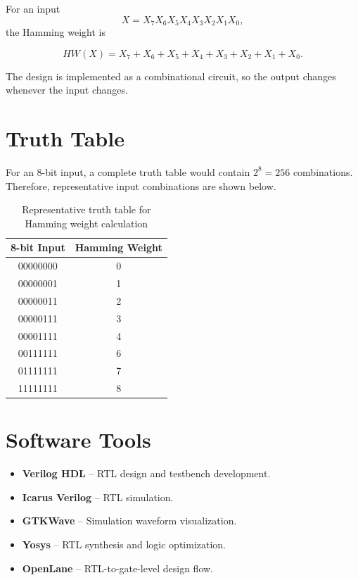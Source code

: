 \documentclass[12pt,a4paper]{report}
\begin{document}
For an input
\[
X = X_7X_6X_5X_4X_3X_2X_1X_0,
\]
the Hamming weight is

\[
HW(X) = X_7 + X_6 + X_5 + X_4 + X_3 + X_2 + X_1 + X_0.
\]

The design is implemented as a combinational circuit, so the output changes whenever the input changes.

\section{Truth Table}

For an 8-bit input, a complete truth table would contain $2^8=256$ combinations. Therefore, representative input combinations are shown below.

\begin{table}[H]
    \centering
    \begin{tabular}{|c|c|}
        \hline
        \textbf{8-bit Input} & \textbf{Hamming Weight} \\
        \hline
        00000000 & 0 \\
        \hline
        00000001 & 1 \\
        \hline
        00000011 & 2 \\
        \hline
        00000111 & 3 \\
        \hline
        00001111 & 4 \\
        \hline
        00111111 & 6 \\
        \hline
        01111111 & 7 \\
        \hline
        11111111 & 8 \\
        \hline
    \end{tabular}
    \caption{Representative truth table for Hamming weight calculation}
    \label{tab:hamming_weight}
\end{table}

\section{Software Tools}

\begin{itemize}
    \item \textbf{Verilog HDL} -- RTL design and testbench development.
    \item \textbf{Icarus Verilog} -- RTL simulation.
    \item \textbf{GTKWave} -- Simulation waveform visualization.
    \item \textbf{Yosys} -- RTL synthesis and logic optimization.
    \item \textbf{OpenLane} -- RTL-to-gate-level design flow.
\end{itemize}
\end{document}
